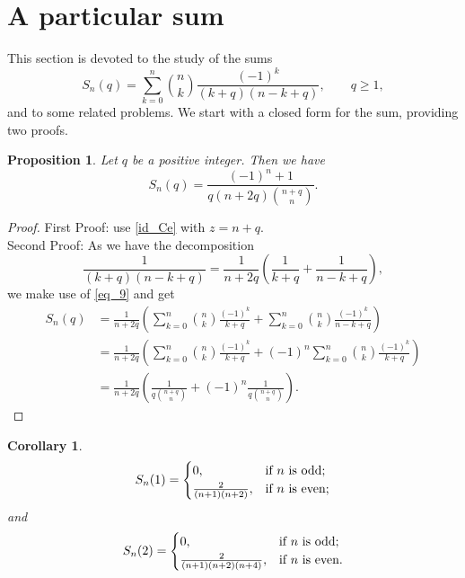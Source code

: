 \documentclass[11pt,reqno]{amsart}
\theoremstyle{plain}
\numberwithin{equation}{section}
\newtheorem{proposition}[thm]{Proposition}
\newtheorem{corollary}[thm]{Corollary}
\begin{document}
\section{A particular sum}

This section is devoted to the study of the sums
$$S_n(q) = \sum_{k=0}^n \binom{n}{k} \frac{(-1)^{k}}{(k+q)(n-k+q)}, \qquad q\geq 1,$$
and to some related problems. We start with a closed form for the sum, providing two proofs.

\begin{proposition}
Let $q$ be a positive integer. Then we have
\begin{equation}\label{id_C6}
S_n(q) = \frac{(-1)^n + 1}{q (n+2q)\binom{n+q}{n}}.
\end{equation}
\end{proposition}
\begin{proof} First Proof: use  \eqref{id_Ce} with $z=n+q$.\\
Second Proof: As we have the decomposition
$$\frac{1}{(k+q)(n-k+q)} = \frac{1}{n+2q}\left ( \frac{1}{k+q} + \frac{1}{n-k+q}\right ),$$
we make use of \eqref{eq_9} and get
\begin{align*}
S_n(q) &= \frac{1}{n+2q}\left (\sum_{k=0}^n \binom{n}{k} \frac{(-1)^{k}}{k+q} + \sum_{k=0}^n \binom{n}{k} \frac{(-1)^{k}}{n-k+q} \right ) \\
&= \frac{1}{n+2q}\left (\sum_{k=0}^n \binom{n}{k} \frac{(-1)^{k}}{k+q} + (-1)^n \sum_{k=0}^n \binom{n}{k} \frac{(-1)^{k}}{k+q} \right ) \\
&= \frac{1}{n+2q}\left ( \frac{1}{q\binom{n+q}{n}} + (-1)^n \frac{1}{q\binom{n+q}{n}}\right ).
\end{align*} 
\end{proof}

\begin{corollary}
\begin{equation*}
S_n(1) = 
\begin{cases}
0, & \text{\rm if $n$ is odd;} \\ 
\frac{2}{(n+1)(n+2)}, & \text{\rm if $n$ is even;} 
\end{cases}
\end{equation*}
and
\begin{equation*}
S_n(2) = 
\begin{cases}
0, & \text{\rm if $n$ is odd;} \\ 
\frac{2}{(n+1)(n+2)(n+4)}, & \text{\rm if $n$ is even.} 
\end{cases}
\end{equation*}
\end{corollary}
\end{document}

